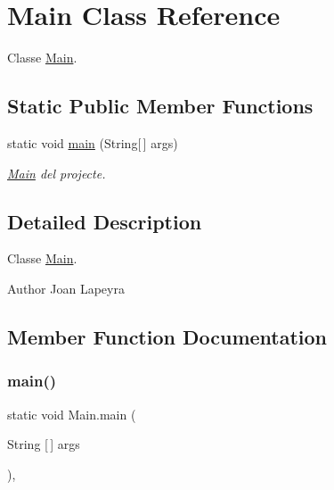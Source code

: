 \hypertarget{classMain}{}\section{Main Class Reference}
\label{classMain}


Classe \hyperlink{classMain}{Main}.  


\subsection*{Static Public Member Functions}
\begin{DoxyCompactItemize}
\item 
static void \hyperlink{classMain_a8a5d0f827edddff706cc0e6740d0579a}{main} (String\mbox{[}$\,$\mbox{]} args)
\begin{DoxyCompactList}\small\item\em \hyperlink{classMain}{Main} del projecte. \end{DoxyCompactList}\end{DoxyCompactItemize}


\subsection{Detailed Description}
Classe \hyperlink{classMain}{Main}. 

\begin{DoxyAuthor}{Author}
Joan Lapeyra 
\end{DoxyAuthor}


\subsection{Member Function Documentation}
\mbox{\label{classMain_a8a5d0f827edddff706cc0e6740d0579a}} 
\subsubsection{\texorpdfstring{main()}{main()}}
{\footnotesize\ttfamily static void Main.\+main (\begin{DoxyParamCaption}\item[{String \mbox{[}$\,$\mbox{]}}]{args }\end{DoxyParamCaption})\hspace{0.3cm}{\ttfamily [inline]}, {\ttfamily [static]}}



